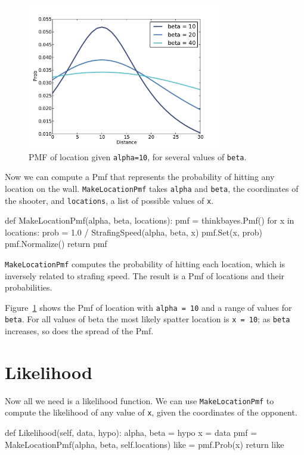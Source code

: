 \documentclass[12pt]{book}
\theoremstyle{exercise}
\begin{document}
\begin{figure}
\centerline{\includegraphics[height=2.5in]{figs/paintball1.pdf}}
\caption{PMF of location given {\tt alpha=10}, for several values of
  {\tt beta}.}
\label{fig.paintball1}
\end{figure}

Now we can compute a Pmf that represents the probability of hitting
any location on the wall.  {\tt MakeLocationPmf} takes {\tt alpha} and
{\tt beta}, the coordinates of the shooter, and {\tt locations}, a
list of possible values of {\tt x}.

\begin{code}
def MakeLocationPmf(alpha, beta, locations):
    pmf = thinkbayes.Pmf()
    for x in locations:
        prob = 1.0 / StrafingSpeed(alpha, beta, x)
        pmf.Set(x, prob)
    pmf.Normalize()
    return pmf
\end{code}

{\tt MakeLocationPmf} computes the probability of hitting
each location, which is inversely related to
strafing speed.  The result is a Pmf of locations and their
probabilities.

Figure~\ref{fig.paintball1} shows the Pmf of location with {\tt alpha
  = 10} and a range of values for {\tt beta}.  For all values of beta
the most likely spatter location is {\tt x = 10}; as {\tt beta}
increases, so does the spread of the Pmf.



\section{Likelihood}

Now all we need is a likelihood function.
We can use {\tt MakeLocationPmf} to compute the likelihood
of any value of {\tt x}, given the coordinates of the opponent.

\begin{code}
    def Likelihood(self, data, hypo):
        alpha, beta = hypo
        x = data
        pmf = MakeLocationPmf(alpha, beta, self.locations)
        like = pmf.Prob(x)
        return like
\end{code}
\end{document}
